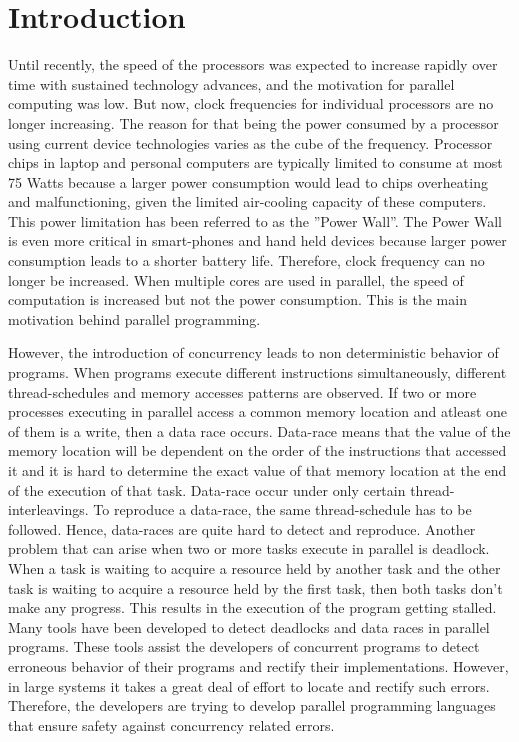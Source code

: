 \section{Introduction}

Until recently, the speed of the processors was expected to increase rapidly over time with sustained technology advances, and the motivation for parallel computing was low. But now, clock frequencies for individual processors are no longer increasing. The reason for that being the power consumed by a processor using current device technologies varies as the cube of the frequency. Processor chips in laptop and personal computers are typically limited to consume at most 75 Watts because a larger power consumption would lead to chips overheating and malfunctioning, given the limited air-cooling capacity of these computers. This power limitation has been referred to as the ''Power Wall''. The Power Wall is even more critical in smart-phones and hand held devices because larger power consumption leads to a shorter battery life. Therefore, clock frequency can no longer be increased. When multiple cores are used in parallel, the speed of computation is increased but not the power consumption. This is the main motivation behind parallel programming.

 However, the introduction of concurrency leads to non deterministic behavior of programs. When programs execute different instructions simultaneously, different thread-schedules and memory accesses patterns are observed. If two or more processes executing in parallel access a common memory location and atleast one of them is a write, then a data race occurs. Data-race means that the value of the memory location will be dependent on the order of the instructions that accessed it and it is hard to determine the exact value of that memory location at the end of the execution of that task. Data-race occur under only certain thread-interleavings. To reproduce a data-race, the same thread-schedule has to be followed. Hence, data-races are quite hard to detect and reproduce. Another problem that can arise when two or more tasks execute in parallel is deadlock. When a task is waiting to acquire a resource held by another task and the other task is waiting to acquire a resource held by the first task, then both tasks don't make any progress. This results in the execution of the program getting stalled. Many tools have been developed to detect deadlocks and data races in parallel programs. These tools assist the developers of concurrent programs to detect erroneous behavior of their programs and rectify their implementations. However, in large systems it takes a great deal of effort to locate and rectify such errors. Therefore, the developers are trying to develop parallel programming languages that ensure safety against concurrency related errors. 
 
